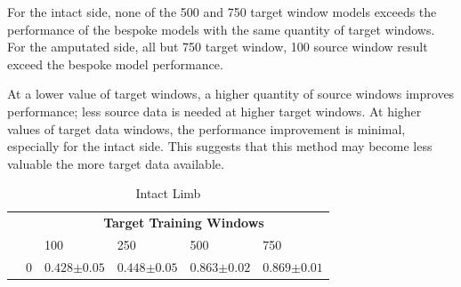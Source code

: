 For the intact side, none of the 500 and 750 target window models exceeds the performance of the bespoke models with the same quantity of target windows. For the amputated side, all but 750 target window, 100 source window result exceed the bespoke model performance.

At a lower value of target windows, a higher quantity of source windows improves performance; less source data is needed at higher target windows. At higher values of target data windows, the performance improvement is minimal, especially for the intact side. This suggests that this method may become less valuable the more target data available.

\begin{table}[!hbt]
    \caption[Table of classification accuracy for amputee test data for a model trained using varying amounts of Source and Target training data]{Table of classification accuracy for amputee test data for a model trained using varying amounts of Source and Target training data. The cell value represents the percentage classification accuracy $\pm\sigma$ $(n=8)$. The highest classification accuracy for each quantity of target windows has been highlighted in bold}
    \label{tab:ch6-classfication-accuracy-mixed-source-target-right}
    \centering
    \begin{subtable}{\textwidth}
        \centering
        \caption{Intact Limb} %
        \begin{tabularx}{0.99\textwidth}{cr| *{4}{Y}}
             &      &                                                                                                                                            \\
             &      & 100                                                  & 250                                         & 500                                         & 750                                         \\
            \hline
             & 0    & $0.428{\scriptscriptstyle\pm0.05}$                   & $0.448{\scriptscriptstyle\pm0.05}$          & $0.863{\scriptscriptstyle\pm0.02}$          & $0.869{\scriptscriptstyle\pm0.01}$          \\

\end{tabularx}
\end{subtable}
\end{table}

